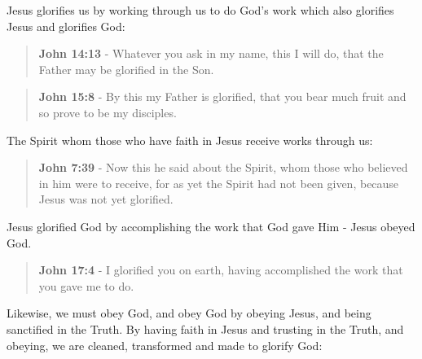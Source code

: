 \documentclass[11pt]{article}
\begin{document}
Jesus glorifies us by working through us to do God's work which also glorifies Jesus and glorifies God:

\begin{quote}
\textbf{John 14:13} - Whatever you ask in my name, this I will do, that the Father may be glorified in the Son.
\end{quote}

\begin{quote}
\textbf{John 15:8} - By this my Father is glorified, that you bear much fruit and so prove to be my disciples.
\end{quote}

The Spirit whom those who have faith in Jesus receive works through us:

\begin{quote}
\textbf{John 7:39} - Now this he said about the Spirit, whom those who believed in him were to receive, for as yet the Spirit had not been given, because Jesus was not yet glorified.
\end{quote}

Jesus glorified God by accomplishing the work that God gave Him - Jesus obeyed God.

\begin{quote}
\textbf{John 17:4} - I glorified you on earth, having accomplished the work that you gave me to do.
\end{quote}

Likewise, we must obey God, and obey God by obeying Jesus, and being sanctified in the Truth. By having faith in Jesus and trusting in the Truth, and obeying, we are cleaned, transformed and made to glorify God:
\end{document}
